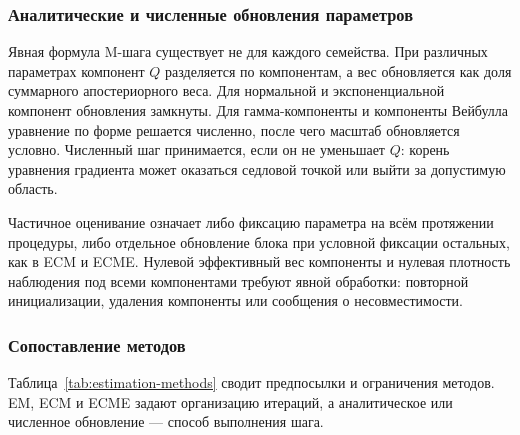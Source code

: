 \subsubsection{Аналитические и численные обновления параметров}
\label{subsec:parameter-updates}

Явная формула M-шага существует не для каждого семейства. При различных параметрах компонент $Q$ разделяется по компонентам, а вес обновляется как доля суммарного апостериорного веса. Для нормальной и экспоненциальной компонент обновления замкнуты. Для гамма-компоненты и компоненты Вейбулла уравнение по форме решается численно, после чего масштаб обновляется условно. Численный шаг принимается, если он не уменьшает $Q$: корень уравнения градиента может оказаться седловой точкой или выйти за допустимую область.

Частичное оценивание означает либо фиксацию параметра на всём протяжении процедуры, либо отдельное обновление блока при условной фиксации остальных, как в ECM и ECME. Нулевой эффективный вес компоненты и нулевая плотность наблюдения под всеми компонентами требуют явной обработки: повторной инициализации, удаления компоненты или сообщения о несовместимости.

\subsubsection{Сопоставление методов}
\label{subsec:estimation-methods-table}

Таблица~\ref{tab:estimation-methods} сводит предпосылки и ограничения методов. EM, ECM и ECME задают организацию итераций, а аналитическое или численное обновление --- способ выполнения шага.

